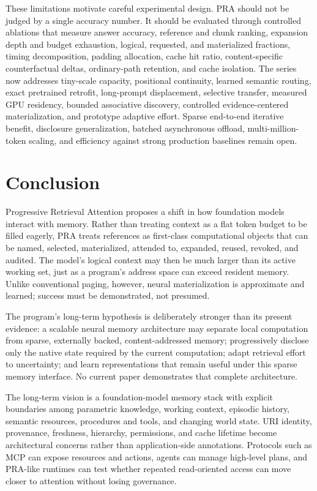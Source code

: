 \documentclass[11pt]{article}
\begin{document}
These limitations motivate careful experimental design. PRA should not be judged by a single accuracy number. It should be evaluated through controlled ablations that measure answer accuracy, reference and chunk ranking, expansion depth and budget exhaustion, logical, requested, and materialized fractions, timing decomposition, padding allocation, cache hit ratio, content-specific counterfactual deltas, ordinary-path retention, and cache isolation. The series now addresses tiny-scale capacity, positional continuity, learned semantic routing, exact pretrained retrofit, long-prompt displacement, selective transfer, measured GPU residency, bounded associative discovery, controlled evidence-centered materialization, and prototype adaptive effort. Sparse end-to-end iterative benefit, disclosure generalization, batched asynchronous offload, multi-million-token scaling, and efficiency against strong production baselines remain open.

\section{Conclusion}

Progressive Retrieval Attention proposes a shift in how foundation models interact with memory. Rather than treating context as a flat token budget to be filled eagerly, PRA treats references as first-class computational objects that can be named, selected, materialized, attended to, expanded, reused, revoked, and audited. The model's logical context may then be much larger than its active working set, just as a program's address space can exceed resident memory. Unlike conventional paging, however, neural materialization is approximate and learned; success must be demonstrated, not presumed.

The program's long-term hypothesis is deliberately stronger than its present evidence: a scalable
neural memory architecture may separate local computation from sparse, externally backed,
content-addressed memory; progressively disclose only the native state required by the current
computation; adapt retrieval effort to uncertainty; and learn representations that remain useful
under this sparse memory interface.  No current paper demonstrates that complete architecture.

The long-term vision is a foundation-model memory stack with explicit boundaries among parametric knowledge, working context, episodic history, semantic resources, procedures and tools, and changing world state. URI identity, provenance, freshness, hierarchy, permissions, and cache lifetime become architectural concerns rather than application-side annotations. Protocols such as MCP can expose resources and actions, agents can manage high-level plans, and PRA-like runtimes can test whether repeated read-oriented access can move closer to attention without losing governance.
\end{document}
